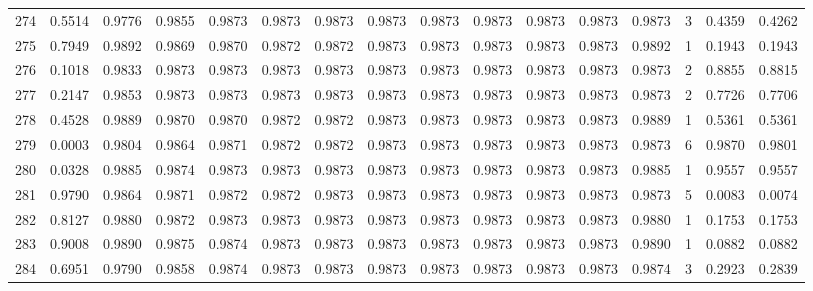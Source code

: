 \begin{tabular}{lrrrrrrrrrrrrrrr}
274 &      0.5514 &  0.9776 &  0.9855 &  0.9873 &  0.9873 &  0.9873 &  0.9873 &  0.9873 &  0.9873 &  0.9873 &   0.9873 &     0.9873 &      3 &                    0.4359 &                     0.4262 \\
275 &      0.7949 &  0.9892 &  0.9869 &  0.9870 &  0.9872 &  0.9872 &  0.9873 &  0.9873 &  0.9873 &  0.9873 &   0.9873 &     0.9892 &      1 &                    0.1943 &                     0.1943 \\
276 &      0.1018 &  0.9833 &  0.9873 &  0.9873 &  0.9873 &  0.9873 &  0.9873 &  0.9873 &  0.9873 &  0.9873 &   0.9873 &     0.9873 &      2 &                    0.8855 &                     0.8815 \\
277 &      0.2147 &  0.9853 &  0.9873 &  0.9873 &  0.9873 &  0.9873 &  0.9873 &  0.9873 &  0.9873 &  0.9873 &   0.9873 &     0.9873 &      2 &                    0.7726 &                     0.7706 \\
278 &      0.4528 &  0.9889 &  0.9870 &  0.9870 &  0.9872 &  0.9872 &  0.9873 &  0.9873 &  0.9873 &  0.9873 &   0.9873 &     0.9889 &      1 &                    0.5361 &                     0.5361 \\
279 &      0.0003 &  0.9804 &  0.9864 &  0.9871 &  0.9872 &  0.9872 &  0.9873 &  0.9873 &  0.9873 &  0.9873 &   0.9873 &     0.9873 &      6 &                    0.9870 &                     0.9801 \\
280 &      0.0328 &  0.9885 &  0.9874 &  0.9873 &  0.9873 &  0.9873 &  0.9873 &  0.9873 &  0.9873 &  0.9873 &   0.9873 &     0.9885 &      1 &                    0.9557 &                     0.9557 \\
281 &      0.9790 &  0.9864 &  0.9871 &  0.9872 &  0.9872 &  0.9873 &  0.9873 &  0.9873 &  0.9873 &  0.9873 &   0.9873 &     0.9873 &      5 &                    0.0083 &                     0.0074 \\
282 &      0.8127 &  0.9880 &  0.9872 &  0.9873 &  0.9873 &  0.9873 &  0.9873 &  0.9873 &  0.9873 &  0.9873 &   0.9873 &     0.9880 &      1 &                    0.1753 &                     0.1753 \\
283 &      0.9008 &  0.9890 &  0.9875 &  0.9874 &  0.9873 &  0.9873 &  0.9873 &  0.9873 &  0.9873 &  0.9873 &   0.9873 &     0.9890 &      1 &                    0.0882 &                     0.0882 \\
284 &      0.6951 &  0.9790 &  0.9858 &  0.9874 &  0.9873 &  0.9873 &  0.9873 &  0.9873 &  0.9873 &  0.9873 &   0.9873 &     0.9874 &      3 &                    0.2923 &                     0.2839 \\

\end{tabular}
